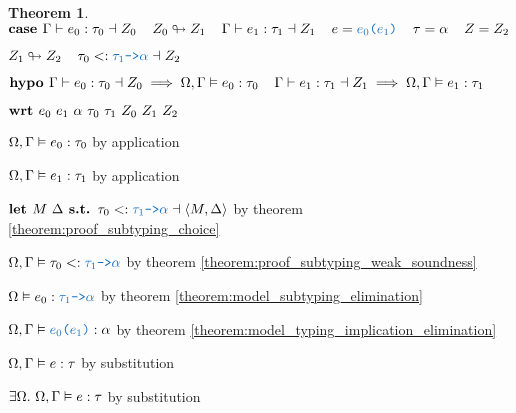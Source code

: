 \documentclass[acmsmall]{acmart}
\theoremstyle{definition}
\newtheorem{theorem}{Theorem}[section]
\begin{document}
\begin{theorem}
  \item \Z $\B{case } 
    \Gamma \entails e_0 \hastype \tau_0 \given Z_0
    \I
    Z_0 \looparrowright Z_1
    \I
    \Gamma \entails e_1 \hastype \tau_1 \given Z_1
    \I
    e = \obj{$e_0$($e_1$)} 
    \I 
    \tau = \alpha 
    \I
    Z = Z_2
  $ 
  \item \Z $ 
    Z_1 \looparrowright Z_2
    \I
    \tau_0 \subtypes \obj{$\tau_1$->$\alpha$} \given Z_2
  $ 
  \item \Z $\textbf{hypo } 
    \Gamma \vdash e_0 : \tau_0 \dashv Z_0
    \implies 
    \Omega, \Gamma \vDash e_0 : \tau_0
    \hspace{4mm}
    \Gamma \vdash e_1 : \tau_1 \dashv Z_1
    \implies 
    \Omega, \Gamma \vDash e_1 : \tau_1
  $ 
  \item \Z $\B{wrt } e_0\ e_1\ \alpha\ \tau_0\ \tau_1\ Z_0\ Z_1\ Z_2 $ 
    \item \Z\Z $
      \Omega, \Gamma \vDash e_0 : \tau_0
    $ by application
    \item \Z\Z $
      \Omega, \Gamma \vDash e_1 : \tau_1
    $ by application

    \item \Z\Z $
      \B{let } M\ \Delta
      \B{ s.t. }
      \tau_0 \subtypes \obj{$\tau_1$->$\alpha$} \given \left<M, \Delta \right>
    $ by theorem \ref{theorem:proof_subtyping_choice} 
    \item \Z\Z $
      \Omega, \Gamma \satisfies \tau_0 \subtypes \obj{$\tau_1$->$\alpha$} 
    $ by theorem \ref{theorem:proof_subtyping_weak_soundness} 
    \item \Z\Z $
      \Omega \satisfies e_0 \hastype \obj{$\tau_1$->$\alpha$} 
    $ by theorem \ref{theorem:model_subtyping_elimination} 
    \item \Z\Z $
      \Omega, \Gamma \satisfies \obj{$e_0$($e_1$)} \hastype \alpha
    $ by theorem \ref{theorem:model_typing_implication_elimination} 
    \item \Z\Z $
      \Omega, \Gamma \vDash e : \tau
    $ by substitution 
    \item \Z\Z $
      \exists \Omega .\ \Omega, \Gamma \vDash e : \tau
    $ by substitution 


\end{theorem}
\end{document}
